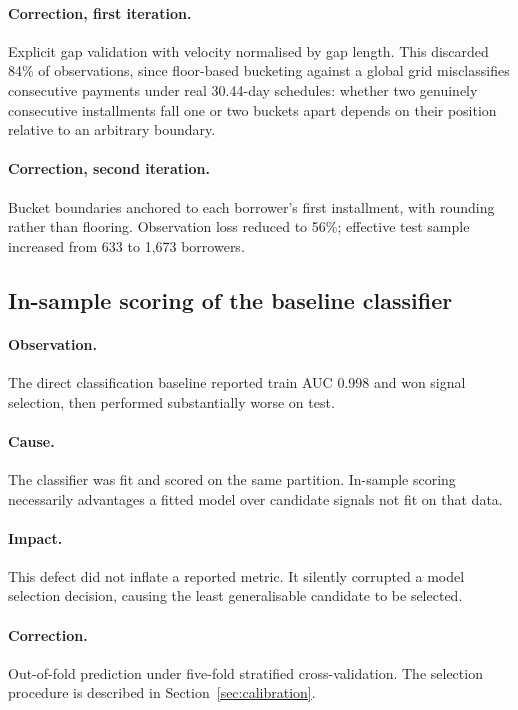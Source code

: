 \documentclass[11pt,a4paper]{article}
\begin{document}
\paragraph{Correction, first iteration.} Explicit gap validation with velocity normalised
by gap length. This discarded 84\% of observations, since floor-based bucketing against a
global grid misclassifies consecutive payments under real 30.44-day schedules: whether
two genuinely consecutive installments fall one or two buckets apart depends on their
position relative to an arbitrary boundary.

\paragraph{Correction, second iteration.} Bucket boundaries anchored to each borrower's
first installment, with rounding rather than flooring. Observation loss reduced to 56\%;
effective test sample increased from 633 to 1,673 borrowers.

\subsection{In-sample scoring of the baseline classifier}

\paragraph{Observation.} The direct classification baseline reported train AUC 0.998 and
won signal selection, then performed substantially worse on test.

\paragraph{Cause.} The classifier was fit and scored on the same partition. In-sample
scoring necessarily advantages a fitted model over candidate signals not fit on that
data.

\paragraph{Impact.} This defect did not inflate a reported metric. It silently corrupted
a model selection decision, causing the least generalisable candidate to be selected.

\paragraph{Correction.} Out-of-fold prediction under five-fold stratified
cross-validation. The selection procedure is described in Section~\ref{sec:calibration}.
\end{document}
